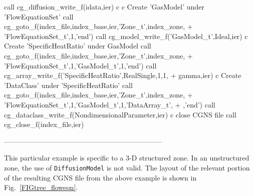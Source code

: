 \documentclass[12pt]{article}
\begin{document}
{\newline\indent      call cg\_diffusion\_write\_f(idata,ier)
\newline c
\newline c   Create 'GasModel' under 'FlowEquationSet'
\newline\indent      call cg\_goto\_f(index\_file,index\_base,ier,'Zone\_t',index\_zone,
\newline + \indent 'FlowEquationSet\_t',1,'end')
\newline\indent      call cg\_model\_write\_f('GasModel\_t',Ideal,ier)
\newline c   Create 'SpecificHeatRatio' under GasModel
\newline\indent      call cg\_goto\_f(index\_file,index\_base,ier,'Zone\_t',index\_zone,
\newline + \indent 'FlowEquationSet\_t',1,'GasModel\_t',1,'end')
\newline\indent      call cg\_array\_write\_f('SpecificHeatRatio',RealSingle,1,1,
\newline + \indent gamma,ier)
\newline c   Create 'DataClass' under 'SpecificHeatRatio'
\newline\indent      call cg\_goto\_f(index\_file,index\_base,ier,'Zone\_t',index\_zone,
\newline + \indent 'FlowEquationSet\_t',1,'GasModel\_t',1,'DataArray\_t',
\newline + ,'end')
\newline\indent      call cg\_dataclass\_write\_f(NondimensionalParameter,ier)
\newline c   close CGNS file
\newline\indent      call cg\_close\_f(index\_file,ier)
}

--------------------------------------------------------------------

This particular example is specific to a 3-D structured zone.
In an unstructured zone, the use of {\tt DiffusionModel} is not valid.
The layout of the relevant portion of the resulting CGNS file
from the above example is shown in Fig.~\ref{FIGtree_floweqn}.
\end{document}
